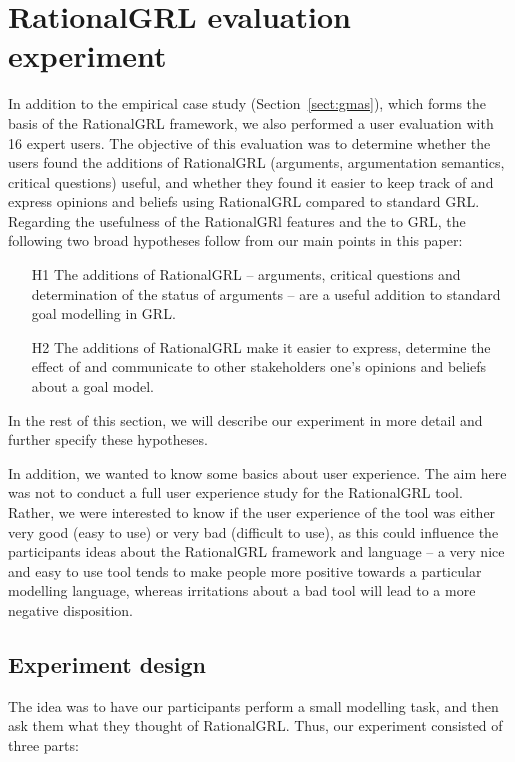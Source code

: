 \section{RationalGRL evaluation experiment}
\label{sect:validation}

In addition to the empirical case study (Section~\ref{sect:gmas}), which forms the basis of the RationalGRL framework, we also performed a user evaluation with 16 expert users. The objective of this evaluation was to determine whether the users found the additions of RationalGRL (arguments, argumentation semantics, critical questions) useful, and whether they found it easier to keep track of and express opinions and beliefs using RationalGRL compared to standard GRL. Regarding the usefulness of the RationalGRl features and the to GRL, the following two broad hypotheses follow from our main points in this paper:

\begin{itemize}
\item[H1] The additions of RationalGRL -- arguments, critical questions and determination of the status of arguments -- are a useful addition to standard goal modelling in GRL.
\item[H2] The additions of RationalGRL make it easier to express, determine the effect of and communicate to other stakeholders one's opinions and beliefs about a goal model.
\end{itemize}

In the rest of this section, we will describe our experiment in more detail and further specify these hypotheses.

In addition, we wanted to know some basics about user experience. The aim here was not to conduct a full user experience study for the RationalGRL tool. Rather, we were interested to know if the user experience of the tool was either very good (easy to use) or very bad (difficult to use), as this could influence the participants ideas about the RationalGRL framework and language -- a very nice and easy to use tool tends to make people more positive towards a particular modelling language, whereas irritations about a bad tool will lead to a more negative disposition. 

\subsection{Experiment design}

The idea was to have our participants perform a small modelling task, and then ask them what they thought of RationalGRL. Thus, our experiment consisted of three parts:

